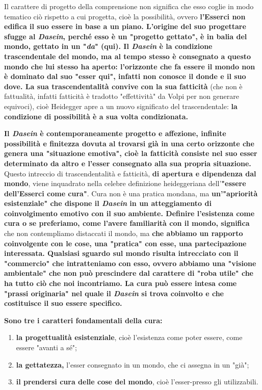 Il carattere di progetto della comprensione non
significa che esso coglie in modo tematico ciò
rispetto a cui progetta, cioè la possibilità, ovvero
\textbf{l'Esserci non edifica il suo essere in base a un
piano. L'origine del suo progettare sfugge al \textit{Dasein},
perché esso è un "progetto gettato", è in balia
del mondo, gettato in un "\textit{da}" (qui).
Il \textit{Dasein} è la condizione trascendentale del mondo,
ma al tempo stesso è consegnato a questo mondo
che lui stesso ha aperto: l'orizzonte che fa essere
il mondo non è dominato dal suo "esser qui", infatti
non conosce il donde e il suo dove. La sua
trascendentalità convive con la sua fatticità} (che non
è fattualità, infatti fatticità è tradotto "effettività" da Volpi per non generare equivoci), cioè Heidegger apre a un nuovo
significato del trascendentale: \textbf{la condizione di
possibilità è a sua volta condizionata.}

\textbf{Il \textit{Dasein} è contemporaneamente progetto e affezione,
infinite possibilità  e finitezza dovuta al
trovarsi già in una certo orizzonte che genera una
"situazione emotiva", cioè la fatticità consiste
nel suo esser determinato da altro e l'esser
consegnato alla sua propria situazione.}
Questo intreccio di trascendentalità e fatticità,
\textbf{di apertura e dipendenza dal mondo}, viene inquadrato
nella celebre definizione heideggeriana dell'\textbf{"essere
dell'Esserci come cura"}. Cura non è una
pratica mondana, ma \textbf{un'"apriorità esistenziale"
che dispone il \textit{Dasein} in un atteggiamento di
coinvolgimento emotivo con il suo ambiente.
Definire l'esistenza come cura o se preferiamo, come l'avere familiarità con il mondo, significa} che
non contempliamo distaccati il mondo, ma \textbf{che
abbiamo un rapporto coinvolgente con le cose, una
"pratica" con esse, una partecipazione interessata.
Qualsiasi sguardo sul mondo risulta intrecciato con
il "commercio" che intratteniamo con esso, ovvero abbiamo
una "visione ambientale" che non può prescindere
dal carattere di "roba utile" che ha tutto ciò
che noi incontriamo. La cura può essere intesa
come "prassi originaria" nel quale il \textit{Dasein} si
trova coinvolto e che costituisce il suo essere
specifico.}

\textbf{Sono tre i caratteri fondamentali della cura:}
\begin{enumerate}
	\item \textbf{la progettualità esistenziale}, cioè l'esistenza
	come poter essere, come essere "avanti a sé";
	\item \textbf{la gettatezza,} l'esser consegnato in un mondo,
	che ci assegna in un "già";
	\item \textbf{il prendersi cura delle cose del mondo}, cioè
	l'esser-presso gli utilizzabili.
\end{enumerate}

